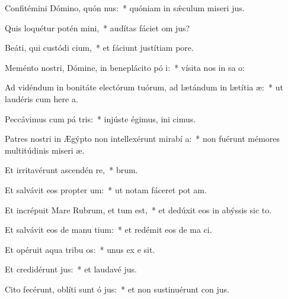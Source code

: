 \item Confitémini Dómino, quón nus:~* quóniam in sǽculum miseri jus.
\item Quis loquétur potén mini,~* audítas fáciet om  jus?
\item Beáti, qui custódi cium,~* et fáciunt justítiam   pore.
\item Meménto nostri, Dómine, in beneplácito pó i:~* vísita nos in sa o:
\item Ad vidéndum in bonitáte electórum tuórum, ad lætándum in lætítia  æ:~* ut laudéris cum here a.
\item Peccávimus cum pá tris:~* injúste égimus, ini cimus.
\item Patres nostri in Ægýpto non intellexérunt mirabí a:~* non fuérunt mémores multitúdinis miseri æ.
\item Et irritavérunt ascendén  re,~*  brum.
\item Et salvávit eos propter  um:~* ut notam fáceret pot am.
\item Et incrépuit Mare Rubrum, et tum est,~* et dedúxit eos in abýssis sic  to.
\item Et salvávit eos de manu tium:~* et redémit eos de ma ci.
\item Et opéruit aqua tribu os:~* unus ex e  sit.
\item Et credidérunt  jus:~* et laudavé  jus.
\item Cito fecérunt, oblíti sunt ó jus:~* et non sustinuérunt con jus.
